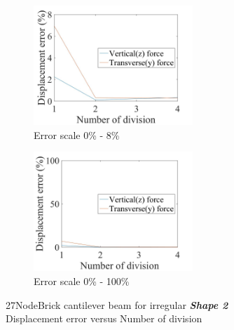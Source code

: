 \documentclass[fleqn,11pt]{article}
\begin{document}
\begin{figure}[H]
  \begin{subfigure}{0.5\textwidth}
    \centering
    \includegraphics[width=6cm]{../Figure-files/error27brick_beam_irregular_shape2.jpeg}
    \caption{Error scale 0\% - 8\%}
  \end{subfigure}
  \begin{subfigure}{0.5\textwidth}
    \centering
    \includegraphics[width=6cm]{../Figure-files/error27brick_beam_irregular_shape2100.jpeg}
    \caption{Error scale 0\% - 100\%}
  \end{subfigure}
  \captionsetup{justification=centering,margin=3cm}
  \caption{27NodeBrick cantilever beam for irregular \textbf{\emph{Shape 2}}\\
      Displacement error   versus   Number of division}
  \label{fig shape 2 27NodeBrick cantilever beam for irregular more elements}
\end{figure}


\end{document}
